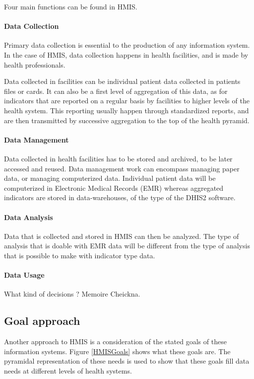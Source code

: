 \documentclass[a4paper,11pt,final,twoside]{article}
\begin{document}
Four main functions can be found in HMIS.

\paragraph{Data Collection} Primary data collection is essential to the production of any information system. In the case of HMIS, data collection happens in health facilities, and is made by health professionals.

Data collected in facilities can be individual patient data collected in patients files or cards. It can also be a first level of aggregation of this data, as for indicators that are reported on a regular basis by facilities to higher levels of the health system. This reporting usually happen through standardized reports, and are then transmitted by successive aggregation to the top of the health pyramid.

\paragraph{Data Management} Data collected in health facilities has to be stored and archived, to be later accessed and reused. Data management work can encompass managing paper data, or managing computerized data. Individual patient data will be computerized in Electronic Medical Records (EMR) whereas aggregated indicators are stored in data-warehouses, of the type of the DHIS2 software.

\paragraph{Data Analysis} Data that is collected and stored in HMIS can then be analyzed. The type of analysis that is doable with EMR data will be different from the type of analysis that is possible to make with indicator type data.

\paragraph{Data Usage} What kind of decisions ? Memoire Cheickna.


	\subsection{Goal approach}
	\label{sec_goal}

Another approach to HMIS is a consideration of the stated goals of these information systems. Figure \ref{HMISGoals} shows what these goals are. The pyramidal representation of these needs is used to show that these goals fill data needs at different levels of health systems.
\end{document}
